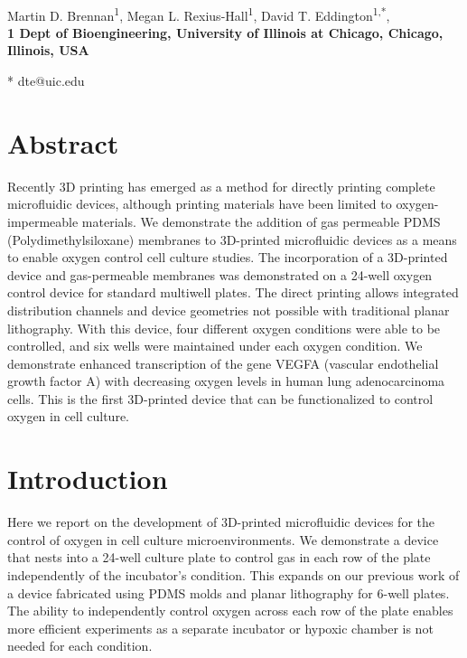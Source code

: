 \documentclass[10pt,letterpaper]{article}
\date{}
\begin{document}
\vspace*{0.35in}

\begin{flushleft}
{\Large
\textbf{}
}
\newline
\\
Martin D. Brennan\textsuperscript{1},
Megan L. Rexius-Hall\textsuperscript{1},
David T. Eddington\textsuperscript{1,*},
\\
\bigskip
\bf{1} Dept of Bioengineering, University of Illinois at Chicago, Chicago, Illinois, USA
\\
\bigskip

* dte@uic.edu

\end{flushleft}
\section*{Abstract}
Recently 3D printing has emerged as a method for directly printing complete microfluidic devices, although printing materials have been limited to oxygen-impermeable materials.
We demonstrate the addition of gas permeable PDMS (Polydimethylsiloxane) membranes to 3D-printed microfluidic devices as a means to enable oxygen control cell culture studies.
The incorporation of a 3D-printed device and gas-permeable membranes was demonstrated on a 24-well oxygen control device for standard multiwell plates.
The direct printing allows integrated distribution channels and device geometries not possible with traditional planar lithography.
With this device, four different oxygen conditions were able to be controlled, and six wells were maintained under each oxygen condition. 
We demonstrate enhanced transcription of the gene VEGFA (vascular endothelial growth factor A) with decreasing oxygen levels in human lung adenocarcinoma cells.
This is the first 3D-printed device that can be functionalized to control oxygen in cell culture.

\linenumbers

\section*{Introduction}
Here we report on the development of 3D-printed microfluidic devices for the control of oxygen in cell culture microenvironments.
We demonstrate a device that nests into a 24-well culture plate to control gas in each row of the plate independently of the incubator's condition.
This expands on our previous work of a device fabricated using PDMS molds and planar lithography for 6-well plates\cite{Oppegard2009,Oppegard2010}.
The ability to independently control oxygen across each row of the plate enables more efficient experiments as a separate incubator or hypoxic chamber is not needed for each condition.
\end{document}
